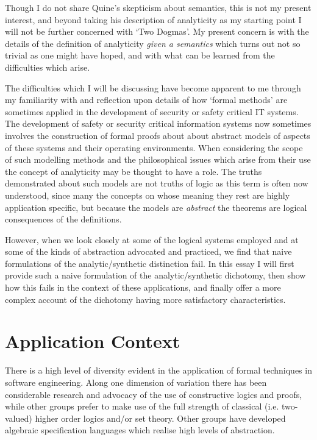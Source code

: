 \documentclass{rbjk}
\begin{document}
\begin{article}
Though I do not share Quine's skepticism about semantics, this is not my present interest, and beyond taking his description of analyticity as my starting point I will not be further concerned with `Two Dogmas'.
My present concern is with the details of the definition of analyticity {\it given a semantics} which turns out not so trivial as one might have hoped, and with what can be learned from the difficulties which arise.

The difficulties which I will be discussing have become apparent to me through my familiarity with and reflection upon details of how `formal methods' are sometimes applied in the development of security or safety critical IT systems.
The development of safety or security critical information systems now sometimes involves the construction of formal proofs about about abstract models of aspects of these systems and their operating environments.
When considering the scope of such modelling methods and the philosophical issues which arise from their use the concept of analyticity may be thought to have a role.
The truths demonstrated about such models are not truths of logic as this term is often now understood, since many the concepts on whose meaning they rest are highly application specific, but because the models are {\it abstract} the theorems are logical consequences of the definitions.

However, when we look closely at some of the logical systems employed and at some of the kinds of abstraction advocated and practiced, we find that naive formulations of the analytic/synthetic distinction fail.
In this essay I will first provide such a naive formulation of the analytic/synthetic dichotomy, then show how this fails in the context of these applications, and finally offer a more complex account of the dichotomy having more satisfactory characteristics.

\section{Application Context}

There is a high level of diversity evident in the application of formal techniques in software engineering.
Along one dimension of variation there has been considerable research and advocacy of the use of constructive logics and proofs, while other groups prefer to make use of the full strength of classical (i.e. two-valued) higher order logics and/or set theory.
Other groups have developed algebraic specification languages which realise high levels of abstraction.


\end{article}
\end{document}
